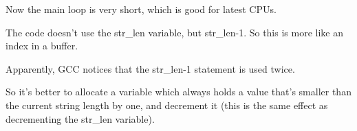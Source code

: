 Now the main loop is very short, which is good for latest \ac{CPU}s.

The code doesn't use the str\_len variable, but str\_len-1.
So this is more like an index in a buffer.

Apparently, GCC notices that the str\_len-1 statement is used twice.

So it's better to allocate a variable which always holds a value that's smaller than 
the current string length by one, 
and decrement it (this is the same effect as decrementing the str\_len variable).
